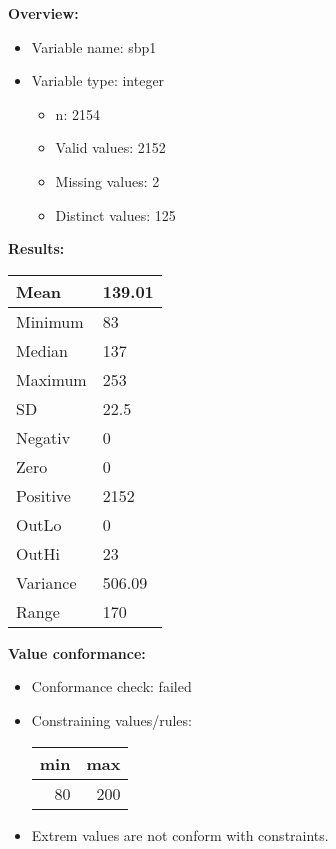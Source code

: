\documentclass[
]{article}
\providecommand{\tightlist}{%
  \setlength{\itemsep}{0pt}\setlength{\parskip}{0pt}}
\begin{document}
\textbf{Overview:}

\begin{itemize}
\tightlist
\item
  Variable name: sbp1
\item
  Variable type: integer

  \begin{itemize}
  \tightlist
  \item
    n: 2154
  \item
    Valid values: 2152
  \item
    Missing values: 2
  \item
    Distinct values: 125
  \end{itemize}
\end{itemize}

\textbf{Results:}\\

\begin{table}[H]
\centering
\begin{tabular}{l|l}
\hline
Mean & 139.01\\
\hline
Minimum & 83\\
\hline
Median & 137\\
\hline
Maximum & 253\\
\hline
SD & 22.5\\
\hline
Negativ & 0\\
\hline
Zero & 0\\
\hline
Positive & 2152\\
\hline
OutLo & 0\\
\hline
OutHi & 23\\
\hline
Variance & 506.09\\
\hline
Range & 170\\
\hline
\end{tabular}
\end{table}

\textbf{Value conformance:}

\begin{itemize}
\tightlist
\item
  Conformance check: failed
\item
  Constraining values/rules:

  \begin{table}[H]
  \centering
  \begin{tabular}{r|r}
  \hline
  \textbf{min} & \textbf{max}\\
  \hline
  80 & 200\\
  \hline
  \end{tabular}
  \end{table}
\item
  Extrem values are not conform with constraints.
\end{itemize}
\end{document}
